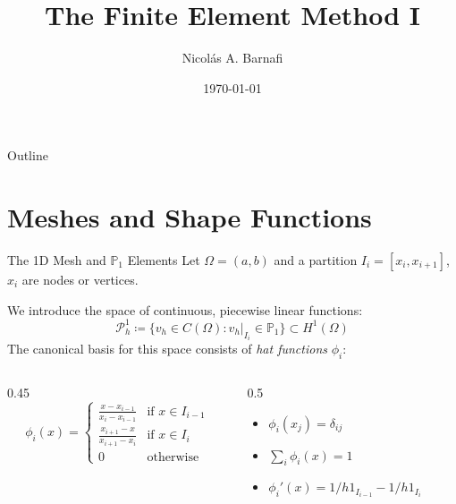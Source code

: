 \documentclass[aspectratio=169]{beamer}
\title[Finite Elements I]{The Finite Element Method I}
\author{Nicol\'as A. Barnafi}
\date{\today}
\renewcommand{\P}{\mathbb{P}}
\begin{document}
\begin{frame}
    \titlepage
\end{frame}

\begin{frame}{Outline}
    \tableofcontents
\end{frame}

\section{Meshes and Shape Functions}

\begin{frame}{The 1D Mesh and $\P_1$ Elements}
    Let $\Omega = (a, b)$ and a partition $I_i = [x_i, x_{i+1}]$, $x_i$ are nodes or vertices.
    
    We introduce the space of continuous, piecewise linear functions:
    $$ \mathcal{P}^1_h \coloneqq \{ v_h\in C(\Omega): v_h|_{I_i} \in \P_1 \} \subset H^1(\Omega)$$
   \pause The canonical basis for this space consists of \emph{hat functions} $\phi_i$:
    
    \begin{columns}
        \begin{column}{0.45\textwidth}
            $$
            \phi_i(x) =
            \begin{cases} 
                \frac{x - x_{i-1}}{x_i - x_{i-1}} & \text{if } x \in I_{i-1} \\ 
                \frac{x_{i+1} - x}{x_{i+1} - x_i} & \text{if } x \in I_i \\ 
                0 & \text{otherwise} 
            \end{cases}
            $$

        \end{column}
        \begin{column}{0.5\textwidth}
            \begin{itemize}
                \item $\phi_i(x_j) = \delta_{ij}$
                \item $\sum_i \phi_i(x) = 1$
                \item $\phi_i'(x) = 1/h 1_{I_{i-1}} - 1/h 1_{I_i}$
            \end{itemize}
        \end{column}
    \end{columns}
            \begin{center}
            \end{center}

\end{frame}
\end{document}
